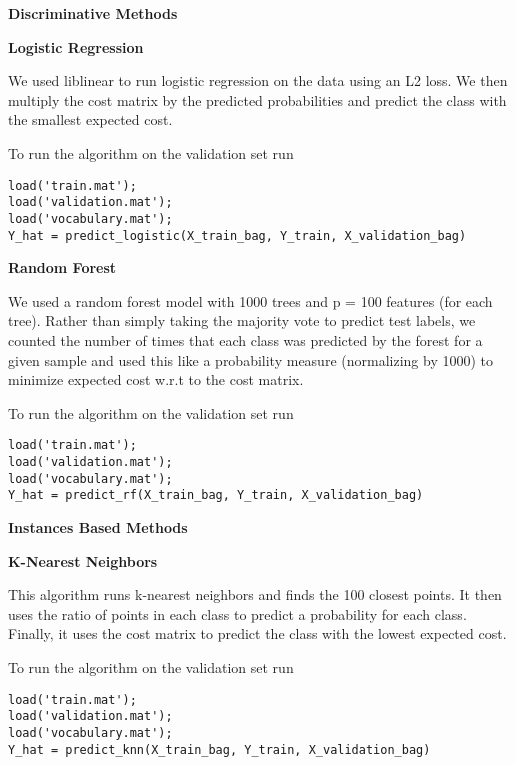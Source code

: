 \documentclass[12pt, a4paper]{article}
\begin{document}
\vspace{5mm}

{\Large\textbf{Discriminative Methods}}

\vspace{3mm}

{\large\textbf{Logistic Regression}}

\vspace{3mm}

We used liblinear to run logistic regression on the data using an L2 loss. We then multiply the cost matrix by the predicted probabilities and predict the class with the smallest expected cost.

To run the algorithm on the validation set run
\begin{verbatim}
load('train.mat');
load('validation.mat');
load('vocabulary.mat');
Y_hat = predict_logistic(X_train_bag, Y_train, X_validation_bag)
\end{verbatim}

\vspace{3mm}

{\large\textbf{Random Forest}}

\vspace{3mm}

We used a random forest model with 1000 trees and p = 100 features (for each tree). Rather than simply taking the majority vote to predict test labels, we counted the number of times that each class was predicted by the forest for a given sample and used this like a probability measure (normalizing by 1000) to minimize expected cost w.r.t to the cost matrix. 

To run the algorithm on the validation set run
\begin{verbatim}
load('train.mat');
load('validation.mat');
load('vocabulary.mat');
Y_hat = predict_rf(X_train_bag, Y_train, X_validation_bag)
\end{verbatim}

\vspace{5mm}

{\Large\textbf{Instances Based Methods}}

\vspace{3mm}

{\large\textbf{K-Nearest Neighbors}}

\vspace{3mm}

This algorithm runs k-nearest neighbors and finds the 100 closest points. It then uses the ratio of points in each class to predict a probability for each class. Finally, it uses the cost matrix to predict the class with the lowest expected cost. 

To run the algorithm on the validation set run
\begin{verbatim}
load('train.mat');
load('validation.mat');
load('vocabulary.mat');
Y_hat = predict_knn(X_train_bag, Y_train, X_validation_bag)
\end{verbatim}
\end{document}
